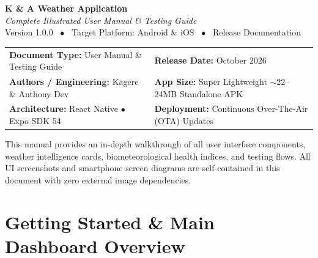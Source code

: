 \documentclass[11pt,a4paper]{article}
\begin{document}
\begin{tcolorbox}[
  enhanced,
  colback=DeepNavy,
  colframe=DeepNavy,
  arc=4mm,
  boxrule=0pt,
  left=16pt,
  right=16pt,
  top=20pt,
  bottom=20pt,
  halign=center
]
  {\huge\bfseries\color{white} K \& A Weather Application}\\[6pt]
  {\Large\itshape\color{CardBg} Complete Illustrated User Manual \& Testing Guide}\\[8pt]
  {\small\color{BorderGray} Version 1.0.0 \ $\bullet$ \ Target Platform: Android \& iOS \ $\bullet$ \ Release Documentation}
\end{tcolorbox}

\vspace{0.8em}

\noindent
\begin{tabularx}{\textwidth}{@{} X X @{}}
\toprule
\textbf{Document Type:} User Manual \& Testing Guide & \textbf{Release Date:} October 2026 \\
\textbf{Authors / Engineering:} Kagere \& Anthony Dev & \textbf{App Size:} Super Lightweight $\sim$22--24MB Standalone APK \\
\textbf{Architecture:} React Native $\bullet$ Expo SDK 54 & \textbf{Deployment:} Continuous Over-The-Air (OTA) Updates \\
\bottomrule
\end{tabularx}

\vspace{1em}

\begin{tipbox}
This manual provides an in-depth walkthrough of all user interface components, weather intelligence cards, biometeorological health indices, and testing flows. All UI screenshots and smartphone screen diagrams are self-contained in this document with zero external image dependencies.
\end{tipbox}

\vspace{0.5em}
\tableofcontents
\vspace{1em}
\newpage

\section{Getting Started \& Main Dashboard Overview}
\end{document}
